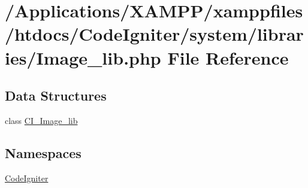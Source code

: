 \hypertarget{_image__lib_8php}{}\section{/\+Applications/\+X\+A\+M\+P\+P/xamppfiles/htdocs/\+Code\+Igniter/system/libraries/\+Image\+\_\+lib.php File Reference}
\label{_image__lib_8php}
\subsection*{Data Structures}
\begin{DoxyCompactItemize}
\item 
class \mbox{\hyperlink{class_c_i___image__lib}{C\+I\+\_\+\+Image\+\_\+lib}}
\end{DoxyCompactItemize}
\subsection*{Namespaces}
\begin{DoxyCompactItemize}
\item 
 \mbox{\hyperlink{namespace_code_igniter}{Code\+Igniter}}
\end{DoxyCompactItemize}
